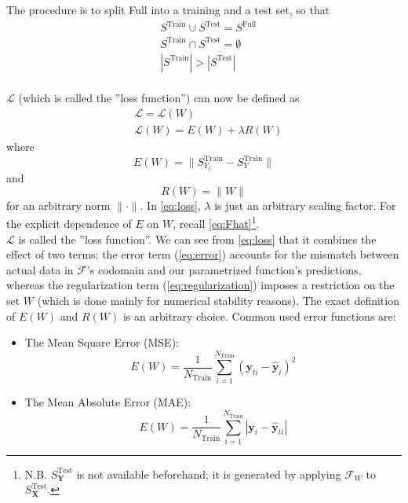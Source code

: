 The procedure is to split Full into a training and a test set, so that
\begin{align}
	& S^\text{Train} \cup S^\text{Test} = S^\text{Full} \\
	& S^\text{Train} \cap S^\text{Test} = \emptyset \\
	& |S^\text{Train}| > |S^\text{Test}|
\end{align}\\
%
$\mathcal{L}$ (which is called the ''loss function'') can now be defined as
\begin{align}
	& \mathcal{L}=\mathcal{L}(W) \\
	& \mathcal{L}(W)=E(W)+\lambda R(W) \label{eq:loss}
\end{align}
where
\begin{equation}\label{eq:error}
	E(W) = \|S^\text{Train}_{Y_t} - S^\text{Train}_Y\|
\end{equation}
and
\begin{equation}\label{eq:regularization}
	R(W) = \|W\|
\end{equation}
for an arbitrary norm $\|\cdot\|$. In \cref{eq:loss}, $\lambda$ is just an arbitrary scaling factor. For the explicit dependence of $E$ on $W$, recall \cref{eq:Fhat}\footnote{N.B. $S^\text{Test}_{\mathbf{{Y}}}$ is not available beforehand; it is generated by applying $\mathcal{{F}}_W$ to $S^\text{Test}_{\mathbf{X}}$.}.\\
%
\indent $\mathcal{L}$ is called the ''loss function''. We can see from \cref{eq:loss} that it combines the effect of two terms: the error term (\cref{eq:error}) accounts for the mismatch between actual data in $\mathcal{F}$'s codomain and our parametrized function's predictions, whereas the regularization term (\cref{eq:regularization}) imposes a restriction on the set $W$ (which is done mainly for numerical stability reasons). The exact definition of $E(W)$ and $R(W)$ is an arbitrary choice. Common used error functions are:
\begin{itemize}
	\item The Mean Square Error (MSE):
	\begin{equation}\label{eq:mse}
		E(W) = \frac{1}{N_{\text{Train}}} \sum_{i=1}^{N_{\text{Train}}} (\mathbf{y}_{ti} - \mathbf{\hat{y}}_i)^2
	\end{equation}
	\item The Mean Absolute Error (MAE):
	\begin{equation}\label{eq:mae}
		E(W) = \frac{1}{N_{\text{Train}}} \sum_{i=1}^{N_{\text{Train}}} \left|\mathbf{y}_i - \mathbf{\hat{y}}_{ti}\right|
	\end{equation}
\end{itemize}

